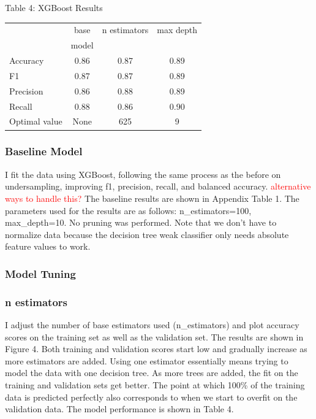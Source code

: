 \documentclass{article}
\newcommand\todo[1]{\textcolor{red}{#1}}
\begin{document}
\begin{table}
	
	\centering
	Table 4: XGBoost Results \\
	\begin{tabular}{ l  c c c }
		\hline
		& base & n estimators & max depth \\
		& model & & \\
		\hline
		Accuracy & 0.86 & 0.87 & 0.89\\
		F1 & 0.87 & 0.87 & 0.89 \\
		Precision & 0.86 & 0.88 & 0.89 \\
		Recall & 0.88 & 0.86 & 0.90 \\
		Optimal value & None & 625 & 9 \\
		
		
		\hline 
	\end{tabular}
\end{table}

\subsubsection*{Baseline Model}
I fit the data using XGBoost, following the same process as the before on undersampling, improving f1, precision, recall, and balanced accuracy. \todo{ alternative ways to handle this? } The baseline results are shown in Appendix Table 1. The parameters used for the results are as follows: n\_estimators=100, max\_depth=10. No pruning was performed. Note that we don't have to normalize data because the decision tree weak classifier only needs absolute feature values to work. 

\subsubsection*{Model Tuning}
\subsubsection*{n estimators}
I adjust the number of base estimators used (n\_estimators) and plot accuracy scores on the training set as well as the validation set. The results are shown in Figure 4. Both training and validation scores start low and gradually increase as more estimators are added. Using one estimator essentially means trying to model the data with one decision tree. As more trees are added, the fit on the training and validation sets get better. The point at which 100\% of the training data is predicted perfectly also corresponds to when we start to overfit on the validation data. The model performance is shown in Table 4.
\end{document}
